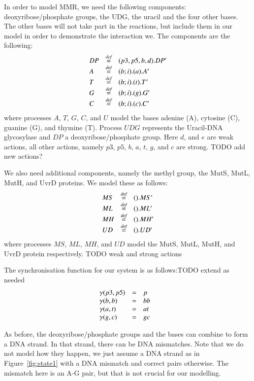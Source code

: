 \documentclass[review]{elsarticle}
\newcommand{\bydef}{\stackrel{\emph{def}}{=}}
\begin{document}
In order to model MMR, we need the following components: deoxyribose/phosphate groups, the UDG, the uracil and the four other bases. The other bases will not take part in the reactions, but include them in our model in order to demonstrate the interaction we. The components are the following:
%
$$\begin{array}{lll}
DP & \bydef & (p3,p5,b,d).DP'\\
A & \bydef & (b;i).(a).A'\\
T & \bydef & (b;i).(t).T'\\
G & \bydef & (b;i).(g).G'\\
C & \bydef & (b;i).(c).C'\\
\end{array}$$
%
where processes $A$, $T$, $G$, $C$, and $U$ model the bases adenine (A), cytosine (C), guanine (G), and thymine (T). Process $UDG$ represents the Uracil-DNA glycosylase and $DP$ a deoxyribose/phosphate group. Here $d$, and $e$ are weak actions, all other actions, namely $p3$, $p5$, $b$, $a$, $t$, $g$, and $c$ are strong. TODO add new actions?

We also need additional components, namely the methyl group, the MutS, MutL, MutH, and UvrD proteins. We model these as follows:
$$\begin{array}{lll}
MS & \bydef & ().MS'\\
ML & \bydef & ().ML'\\
MH & \bydef & ().MH'\\
UD & \bydef & ().UD'\\
\end{array}$$
%
where processes $MS$, $ML$, $MH$, and $UD$ model the MutS, MutL, MutH, and UvrD protein respectively. TODO weak and strong actions


The synchronisation function for our system is as follows:TODO extend as needed
%
$$\begin{array}{ l c l l }
\gamma(p3,p5) & = & p & \\
\gamma(b,b) & = & bb &\\
\gamma(a,t) & = & at &  \\
\gamma(g,c) & = & gc & \\
\end{array}$$
%

As before, the deoxyribose/phosphate groups and the bases can combine to form a DNA strand. In that strand, there can be DNA mismatches. Note that we do not model how they happen, we just assume a DNA strand as in Figure~\ref{fig:state1} with a DNA mismatch and correct pairs otherwise. The mismatch here is an A-G pair, but that is not crucial for our modelling.
\end{document}
